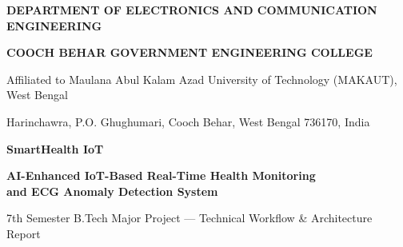 \documentclass[12pt]{article}
\begin{document}

\thispagestyle{empty}
\begin{center}
    \vspace*{0.3cm}
    {\fontsize{14}{17}\selectfont\textbf{DEPARTMENT OF ELECTRONICS AND COMMUNICATION ENGINEERING}\par}
    \vspace{0.15cm}
    {\fontsize{13}{16}\selectfont\textbf{COOCH BEHAR GOVERNMENT ENGINEERING COLLEGE}\par}
    \vspace{0.12cm}
    {\small Affiliated to Maulana Abul Kalam Azad University of Technology (MAKAUT), West Bengal\par}
    \vspace{0.04cm}
    {\footnotesize Harinchawra, P.O. Ghughumari, Cooch Behar, West Bengal 736170, India\par}
\end{center}

\vfill
\begin{tcolorbox}[colback=black!4, colframe=black!85, arc=3.5pt, boxrule=1.0pt, width=\linewidth, top=12pt, bottom=12pt, left=10pt, right=10pt]
    \centering
    {\fontsize{20}{24}\selectfont\textbf{SmartHealth IoT}\par}
    \vspace{0.25cm}
    {\fontsize{13.5}{17}\selectfont\textbf{AI-Enhanced IoT-Based Real-Time Health Monitoring\\ and ECG Anomaly Detection System}\par}
    \vspace{0.25cm}
    {\small 7th Semester B.Tech Major Project --- Technical Workflow \& Architecture Report\par}
\end{tcolorbox}
\end{document}
